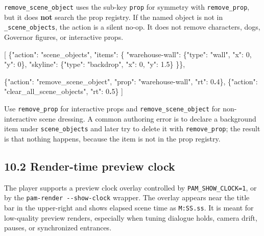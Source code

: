 \documentclass[
  12pt,
  letterpaper,
]{book}
\newenvironment{Shaded}{}{}
\newcommand{\DataTypeTok}[1]{\textcolor[rgb]{0.56,0.13,0.00}{#1}}
\newcommand{\DecValTok}[1]{\textcolor[rgb]{0.25,0.63,0.44}{#1}}
\newcommand{\ErrorTok}[1]{\textcolor[rgb]{1.00,0.00,0.00}{\textbf{#1}}}
\newcommand{\FloatTok}[1]{\textcolor[rgb]{0.25,0.63,0.44}{#1}}
\newcommand{\FunctionTok}[1]{\textcolor[rgb]{0.02,0.16,0.49}{#1}}
\newcommand{\OtherTok}[1]{\textcolor[rgb]{0.00,0.44,0.13}{#1}}
\newcommand{\StringTok}[1]{\textcolor[rgb]{0.25,0.44,0.63}{#1}}
\begin{document}
\texttt{remove\_scene\_object} uses the sub-key \texttt{prop} for
symmetry with \texttt{remove\_prop}, but it does \textbf{not} search the
prop registry. If the named object is not in \texttt{\_scene\_objects},
the action is a silent no-op. It does not remove characters, dogs,
Governor figures, or interactive props.

\begin{Shaded}
\begin{Highlighting}[]
\OtherTok{[}
  \FunctionTok{\{}\DataTypeTok{"action"}\FunctionTok{:} \StringTok{"scene\_objects"}\FunctionTok{,} \DataTypeTok{"items"}\FunctionTok{:} \FunctionTok{\{}
    \DataTypeTok{"warehouse{-}wall"}\FunctionTok{:} \FunctionTok{\{}\DataTypeTok{"type"}\FunctionTok{:} \StringTok{"wall"}\FunctionTok{,} \DataTypeTok{"x"}\FunctionTok{:} \DecValTok{0}\FunctionTok{,} \DataTypeTok{"y"}\FunctionTok{:} \DecValTok{0}\FunctionTok{\},}
    \DataTypeTok{"skyline"}\FunctionTok{:}        \FunctionTok{\{}\DataTypeTok{"type"}\FunctionTok{:} \StringTok{"backdrop"}\FunctionTok{,} \DataTypeTok{"x"}\FunctionTok{:} \DecValTok{0}\FunctionTok{,} \DataTypeTok{"y"}\FunctionTok{:} \FloatTok{1.5}\FunctionTok{\}}
  \FunctionTok{\}\}}\OtherTok{,}

  \FunctionTok{\{}\DataTypeTok{"action"}\FunctionTok{:} \StringTok{"remove\_scene\_object"}\FunctionTok{,} \DataTypeTok{"prop"}\FunctionTok{:} \StringTok{"warehouse{-}wall"}\FunctionTok{,} \DataTypeTok{"rt"}\FunctionTok{:} \DecValTok{0}\ErrorTok{.}\DecValTok{4}\FunctionTok{\}}\OtherTok{,}
  \FunctionTok{\{}\DataTypeTok{"action"}\FunctionTok{:} \StringTok{"clear\_all\_scene\_objects"}\FunctionTok{,} \DataTypeTok{"rt"}\FunctionTok{:} \DecValTok{0}\ErrorTok{.}\DecValTok{5}\FunctionTok{\}}
\OtherTok{]}
\end{Highlighting}
\end{Shaded}

Use \texttt{remove\_prop} for interactive props and
\texttt{remove\_scene\_object} for non-interactive scene dressing. A
common authoring error is to declare a background item under
\texttt{scene\_objects} and later try to delete it with
\texttt{remove\_prop}; the result is that nothing happens, because the
item is not in the prop registry.

\subsection{10.2 Render-time preview
clock}\label{render-time-preview-clock}

The player supports a preview clock overlay controlled by
\texttt{PAM\_SHOW\_CLOCK=1}, or by the
\texttt{pam-render\ -\/-show-clock} wrapper. The overlay appears near
the title bar in the upper-right and shows elapsed scene time as
\texttt{M:SS.ss}. It is meant for low-quality preview renders,
especially when tuning dialogue holds, camera drift, pauses, or
synchronized entrances.
\end{document}

